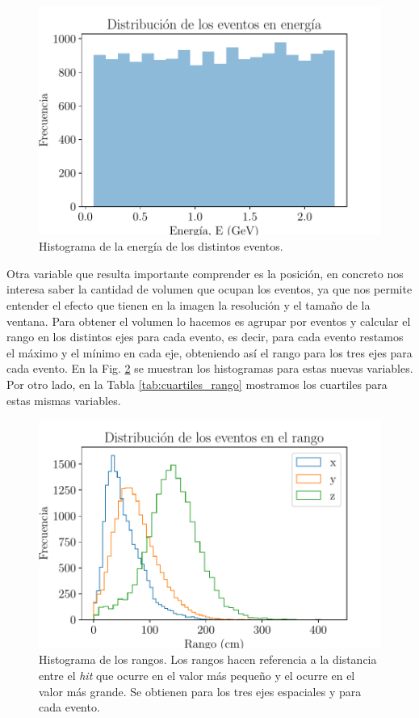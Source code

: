 \documentclass[a4paper,12pt,twoside,titlepage]{article}
\begin{document}
\begin{figure}[h!]
  \centering
  \includegraphics[scale=0.85]{hist_en.pdf}
  \caption{Histograma de la energía de los distintos eventos.}
  \label{fig:hist_energia}
\end{figure}

Otra variable que resulta importante comprender es la posición, en concreto nos interesa saber la cantidad de volumen que ocupan los eventos, ya que nos permite entender el efecto que tienen en la imagen la resolución y el tamaño de la ventana. Para obtener el volumen lo hacemos es agrupar por eventos y calcular el rango en los distintos ejes para cada evento, es decir, para cada evento restamos el máximo y el mínimo en cada eje, obteniendo así el rango para los tres ejes para cada evento. En la Fig. \ref{fig:hist_rango} se muestran los histogramas para estas nuevas variables. Por otro lado, en la Tabla \ref{tab:cuartiles_rango} mostramos los cuartiles para estas mismas variables.

\begin{figure}[h!]
  \centering
  \includegraphics[scale=0.85]{hist_rango.pdf}
  \caption{Histograma de los rangos. Los rangos hacen referencia a la distancia entre el \textit{hit} que ocurre en el valor más pequeño y el ocurre en el valor más grande. Se obtienen para los tres ejes espaciales y para cada evento.}
  \label{fig:hist_rango}
\end{figure}
\end{document}
